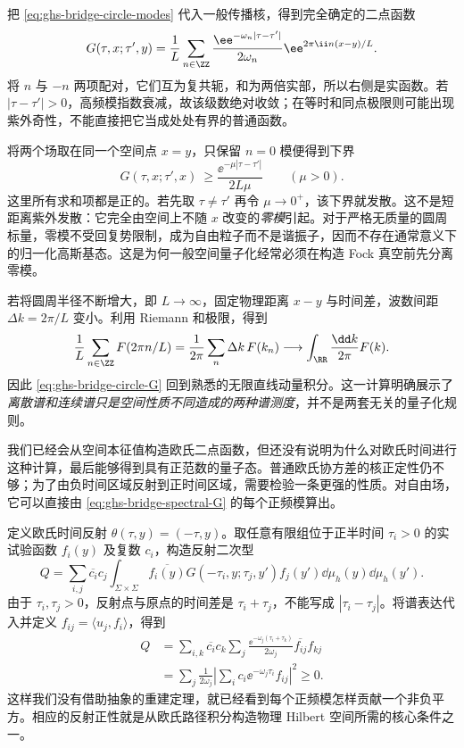 把 \cref{eq:ghs-bridge-circle-modes} 代入一般传播核，得到完全确定的二点函数
\begin{equation}\label{eq:ghs-bridge-circle-G}
 G(\tau,x;\tau',y)=\frac1L\sum_{n\in\ZZ}
 \frac{\ee^{-\omega_n|\tau-\tau'|}}{2\omega_n}
 \ee^{2\pi\ii n(x-y)/L}.
\end{equation}
将 $n$ 与 $-n$ 两项配对，它们互为复共轭，和为两倍实部，所以右侧是实函数。若 $|\tau-\tau'|>0$，高频模指数衰减，故该级数绝对收敛；在等时和同点极限则可能出现紫外奇性，不能直接把它当成处处有界的普通函数。

将两个场取在同一个空间点 $x=y$，只保留 $n=0$ 模便得到下界
\[
 G(\tau,x;\tau',x)\ \geq\frac{\ee^{-\mu|\tau-\tau'|}}{2L\mu}
 \qquad(\mu>0).
\]
这里所有求和项都是正的。若先取 $\tau\ne\tau'$ 再令 $\mu\to0^+$，该下界就发散。这不是短距离紫外发散：它完全由空间上不随 $x$ 改变的\emph{零模}引起。对于严格无质量的圆周标量，零模不受回复势限制，成为自由粒子而不是谐振子，因而不存在通常意义下的归一化高斯基态。这是为何一般空间量子化经常必须在构造 Fock 真空前先分离零模。

若将圆周半径不断增大，即 $L\to\infty$，固定物理距离 $x-y$ 与时间差，波数间距 $\Delta k=2\pi/L$ 变小。利用 Riemann 和极限，得到
\[
 \frac1L\sum_{n\in\ZZ}F(2\pi n/L)
 =\frac1{2\pi}\sum_n\Delta k\,F(k_n)
 \longrightarrow\int_\RR\frac{\dd k}{2\pi}F(k).
\]
因此 \cref{eq:ghs-bridge-circle-G} 回到熟悉的无限直线动量积分。这一计算明确展示了\emph{离散谱和连续谱只是空间性质不同造成的两种谱测度}，并不是两套无关的量子化规则。


我们已经会从空间本征值构造欧氏二点函数，但还没有说明为什么对欧氏时间进行这种计算，最后能够得到具有正范数的量子态。普通欧氏协方差的核正定性仍不够；为了由负时间区域反射到正时间区域，需要检验一条更强的性质。对自由场，它可以直接由 \cref{eq:ghs-bridge-spectral-G} 的每个正频模算出。

定义欧氏时间反射 $\theta(\tau,y)=(-\tau,y)$。取任意有限组位于正半时间 $\tau_i>0$ 的实试验函数 $f_i(y)$ 及复数 $c_i$，构造反射二次型
\[
 Q=\sum_{i,j}\overline{c_i}c_j
 \int_{\Sigma\times\Sigma}\overline{f_i(y)}
 G(-\tau_i,y;\tau_j,y')f_j(y')\dd\mu_h(y)\dd\mu_h(y').
\]
由于 $\tau_i,\tau_j>0$，反射点与原点的时间差是 $\tau_i+\tau_j$，不能写成 $|\tau_i-\tau_j|$。将谱表达代入并定义 $f_{ij}=\langle u_j,f_i\rangle$，得到
\begin{align*}
 Q&=\sum_{i,k}\overline{c_i}c_k\sum_j
 \frac{\ee^{-\omega_j(\tau_i+\tau_k)}}{2\omega_j}
 \overline{f_{ij}}f_{kj}\\
 &=\sum_j\frac1{2\omega_j}
 \left|\sum_i c_i\ee^{-\omega_j\tau_i}f_{ij}\right|^2\ge0.
\end{align*}
这样我们没有借助抽象的重建定理，就已经看到每个正频模怎样贡献一个非负平方。相应的反射正性就是从欧氏路径积分构造物理 Hilbert 空间所需的核心条件之一。


